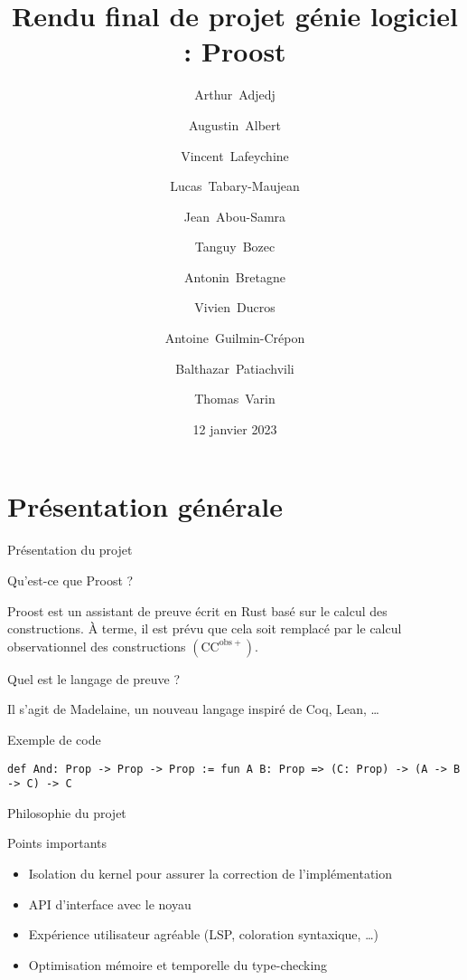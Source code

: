 \documentclass[12pt, aspectratio=169]{beamer}
\title[Rendu final : Proost]{Rendu final de projet génie logiciel : Proost}
\author[Projet génie logiciel]{
    \normalsize
    Arthur~Adjedj \and 
    Augustin~Albert \and
    Vincent~Lafeychine \and
    Lucas~Tabary-Maujean \and
    Jean~Abou-Samra \and
    Tanguy~Bozec \and
    Antonin~Bretagne \and
    Vivien~Ducros \and
    Antoine~Guilmin-Crépon \and
    Balthazar~Patiachvili \and
    Thomas~Varin
}
\date{12 janvier 2023}
\institute[]{ENS Paris-Saclay}
\begin{document}
    \maketitle

    \section{Présentation générale}

        \begin{frame}[fragile]{Présentation du projet}
        
            \begin{block}{Qu'est-ce que Proost ?}
                
                Proost est un assistant de preuve écrit en Rust basé sur le calcul des constructions. À terme, il est prévu que cela soit remplacé par le calcul observationnel des constructions $\left(\mathrm{CC}^{\mathrm{obs}+}\right)$.

            \end{block} \pause

            \begin{block}{Quel est le langage de preuve ?}
                
                Il s'agit de Madelaine, un nouveau langage inspiré de Coq, Lean, \dots

            \end{block} \pause

            \begin{exampleblock}{Exemple de code}
                
                \begin{lstlisting}[language=mdln]
                    def And: Prop -> Prop -> Prop := fun A B: Prop => (C: Prop) -> (A -> B -> C) -> C
                \end{lstlisting}

            \end{exampleblock}

        \end{frame}

        \begin{frame}{Philosophie du projet}
            
            \begin{alertblock}{Points importants}
                
                \begin{itemize}
                    \item Isolation du kernel pour assurer la correction de l'implémentation \pause
                    \item API d'interface avec le noyau \pause
                    \item Expérience utilisateur agréable (LSP, coloration syntaxique, \dots) \pause
                    \item Optimisation mémoire et temporelle du type-checking
                \end{itemize}

            \end{alertblock}

        \end{frame}
\end{document}
